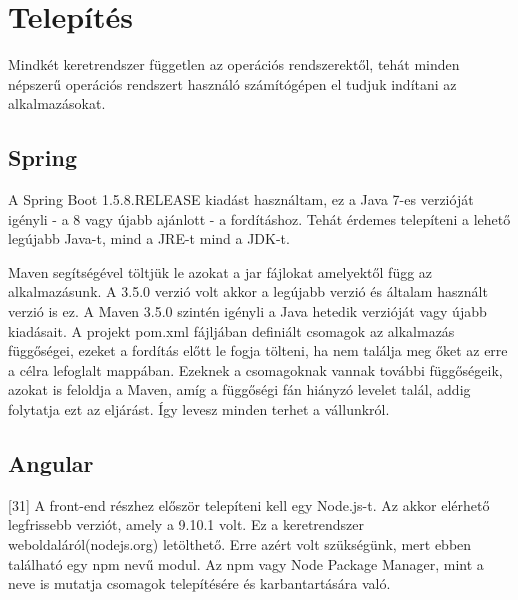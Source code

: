 



\section{Telepítés}

Mindkét keretrendszer független az operációs rendszerektől, tehát minden népszerű operációs rendszert használó számítógépen el tudjuk indítani az alkalmazásokat.

\subsection{Spring}

A Spring Boot 1.5.8.RELEASE kiadást használtam, ez a Java 7-es verzióját igényli - a 8 vagy újabb ajánlott - a fordításhoz. Tehát érdemes telepíteni a lehető legújabb Java-t, mind a JRE-t mind a JDK-t.

Maven segítségével töltjük le azokat a jar fájlokat amelyektől függ az alkalmazásunk. A 3.5.0 verzió volt akkor a legújabb verzió és általam használt verzió is ez. A Maven 3.5.0 szintén igényli a Java hetedik verzióját vagy újabb kiadásait. A projekt pom.xml fájljában definiált csomagok az alkalmazás függőségei, ezeket a fordítás előtt le fogja tölteni, ha nem találja meg őket az erre a célra lefoglalt mappában. Ezeknek a csomagoknak vannak további függőségeik, azokat is feloldja a Maven, amíg a függőségi fán hiányzó levelet talál, addig folytatja ezt az eljárást. Így levesz minden terhet a vállunkról.

\subsection{Angular}

[31] A front-end részhez először telepíteni kell egy Node.js-t. Az akkor elérhető legfrissebb verziót, amely a 9.10.1 volt. Ez a keretrendszer weboldaláról(nodejs.org) letölthető. Erre azért volt szükségünk, mert ebben található egy npm nevű modul. Az npm vagy Node Package Manager, mint a neve is mutatja csomagok telepítésére és karbantartására való.

